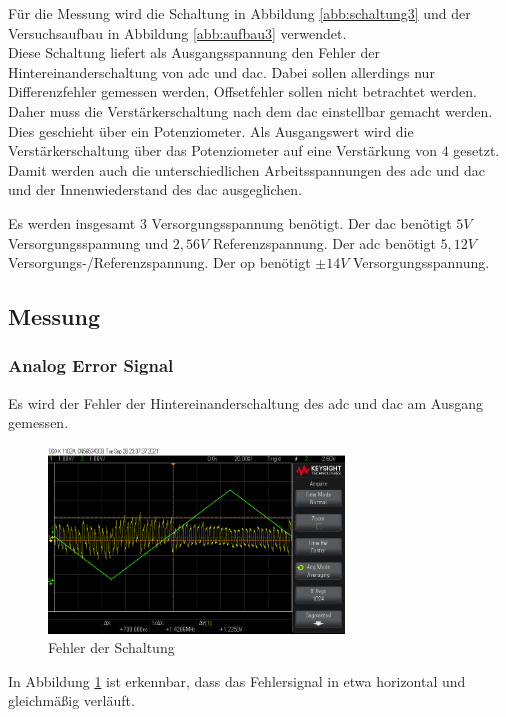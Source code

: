 \documentclass[12pt, a4paper, ngerman]{article}
\begin{document}
Für die Messung wird die Schaltung in Abbildung \ref{abb:schaltung3}
und der Versuchsaufbau in Abbildung \ref{abb:aufbau3} verwendet. \\
Diese Schaltung liefert als Ausgangsspannung den Fehler
der Hintereinanderschaltung von \ac{adc} und \ac{dac}.
Dabei sollen allerdings nur Differenzfehler gemessen werden,
Offsetfehler sollen nicht betrachtet werden.
Daher muss die Verstärkerschaltung nach dem \ac{dac} einstellbar gemacht werden.
Dies geschieht über ein Potenziometer.
Als Ausgangswert wird die Verstärkerschaltung über das Potenziometer auf eine Verstärkung von $4$ gesetzt.
Damit werden auch die unterschiedlichen Arbeitsspannungen des \ac{adc} und \ac{dac} und der Innenwiederstand des \ac{dac} ausgeglichen.

Es werden insgesamt 3 Versorgungsspannung benötigt.
Der \ac{dac} benötigt $5V$ Versorgungsspannung und $2,56V$ Referenzspannung.
Der \ac{adc} benötigt $5,12V$ Versorgungs-/Referenzspannung.
Der \ac{op} benötigt $\pm 14V$ Versorgungsspannung.


\subsection{Messung}

\subsubsection{Analog Error Signal}

Es wird der Fehler der Hintereinanderschaltung des \ac{adc} und \ac{dac} am Ausgang gemessen.

\begin{figure}
  \centering
  \includegraphics[width=0.7\textwidth]{scope_38.png}
  \caption{Fehler der Schaltung}
  \label{plot:fehler1}
\end{figure}

In Abbildung \ref{plot:fehler1} ist erkennbar,
dass das Fehlersignal in etwa horizontal und gleichmäßig verläuft.
\end{document}
